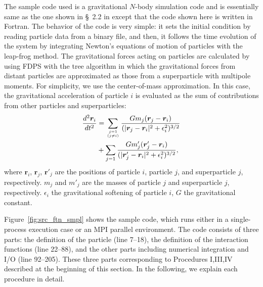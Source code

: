 \documentclass[twocolumn,useamsfonts]{pasj01}
\newcommand{\diff}{{\mathrm d}}
\begin{document}
The sample code used is a gravitational $N$-body simulation code and is essentially same as the one shown in \S~2.2 in \citet{iwasawa16:_implem_fdps} except that the code shown here is written in Fortran. The behavior of the code is very simple: it sets the initial condition by reading particle data from a binary file, and then, it follows the time evolution of the system by integrating Newton's equations of motion of particles with the leap-frog method. The gravitational forces acting on particles are calculated by using FDPS with the tree algorithm in which the gravitational forces from distant particles are approximated as those from a superparticle with multipole moments. For simplicity, we use the center-of-mass approximation. In this case, the gravitational acceleration of particle $i$ is evaluated as the sum of contributions from other particles and superparticles:
\begin{eqnarray}
\frac{\diff^{2}\bm{r}_{i}}{\diff t^{2}} & = \sum_{j=1 \atop (j\neq i)}\frac{Gm_{j}(\bm{r}_{j}-\bm{r}_{i})}{(|\bm{r}_{j}-\bm{r}_{i}|^{2}+\epsilon^{2}_{i})^{3/2}} \nonumber\\
& +\sum_{j=1}\frac{G m'_{j}(\bm{r}'_{j}-\bm{r}_{i})}{(|\bm{r}'_{j}-\bm{r}_{i}|^{2}+\epsilon^{2}_{i})^{3/2}}, \label{eq:nbody_EoM_tree}
\end{eqnarray}
where $\bm{r}_{i}$, $\bm{r}_{j}$, $\bm{r}'_{j}$ are the positions of particle $i$,  particle $j$, and superparticle $j$, respectively. $m_{j}$ and $m'_{j}$ are the masses of particle $j$ and superparticle $j$, respectively. $\epsilon_{i}$ the gravitational softening of particle $i$, $G$ the gravitational constant. 


Figure~\ref{fig:src_ftn_smpl} shows the sample code, which runs either in a single-process execution case or an MPI parallel environment. The code consists of three parts: the definition of the particle (line 7--18), the definition of the interaction functions (line 22--88), and the other parts including numerical integration and I/O (line 92--205). These three parts corresponding to Procedures I,III,IV described at the beginning of this section. In the following, we explain each procedure in detail.
\end{document}
